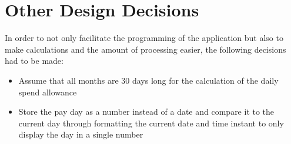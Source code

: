 \chapter{Other Design Decisions}
In order to not only facilitate the programming of the application but also to make calculations and the amount of processing easier, the following decisions had to be made:

\begin{itemize}
  \item Assume that all months are 30 days long for the calculation of the daily spend allowance
  \item Store the pay day as a number instead of a date and compare it to the current day through formatting the current date and time instant to only display the day in a single number
\end{itemize}
